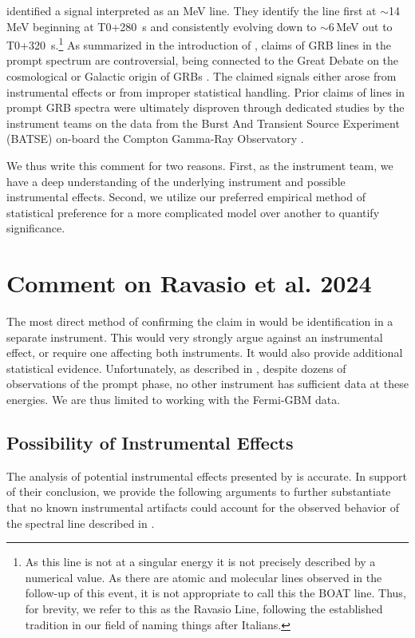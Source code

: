 \documentclass{aastex61}
\begin{document}
\citet{ravasio2024mega} identified a signal interpreted as an MeV line. They identify the line first at $\sim$14\,MeV beginning at T0+280~s and consistently evolving down to $\sim$6\,MeV out to T0+320~s.\footnote{As this line is not at a singular energy it is not precisely described by a numerical value. As there are atomic and molecular lines observed in the follow-up of this event, it is not appropriate to call this the BOAT line. Thus, for brevity, we refer to this as the Ravasio Line, following the established tradition in our field of naming things after Italians.} As summarized in the introduction of \citet{ravasio2024mega}, claims of GRB lines in the prompt spectrum are controversial, being connected to the Great Debate on the cosmological or Galactic origin of GRBs \citep{Nemiroff95greatdebategrb}. The claimed signals either arose from instrumental effects or from improper statistical handling. Prior claims of lines in prompt GRB spectra were ultimately disproven through dedicated studies by the instrument teams on the data from the Burst And Transient Source Experiment (BATSE) on-board the Compton Gamma-Ray Observatory \citep[e.g.][]{1994ApJ...433L..77P, 1994ApJ...434..560B, 1995ApJ...447..289B, 1996ApJ...458..746B, 1996AIPC..384..153B, 1997ApJ...485..747B, 1999ApL&C..39..237B}.

We thus write this comment for two reasons. First, as the instrument team, we have a deep understanding of the underlying instrument and possible instrumental effects. Second, we utilize our preferred empirical method of statistical preference for a more complicated model over another to quantify significance.


\section{Comment on Ravasio et al. 2024}
The most direct method of confirming the claim in \citet{ravasio2024mega} would be identification in a separate instrument. This would very strongly argue against an instrumental effect, or require one affecting both instruments. It would also provide additional statistical evidence. Unfortunately, as described in \citet{ravasio2024mega}, despite dozens of observations of the prompt phase, no other instrument has sufficient data at these energies. We are thus limited to working with the Fermi-GBM data.

\subsection{Possibility of Instrumental Effects}
The analysis of potential instrumental effects presented by \citet{ravasio2024mega} is accurate. In support of their conclusion, we provide the following arguments to further substantiate that no known instrumental artifacts could account for the observed behavior of the spectral line described in \citet{ravasio2024mega}.
\end{document}
